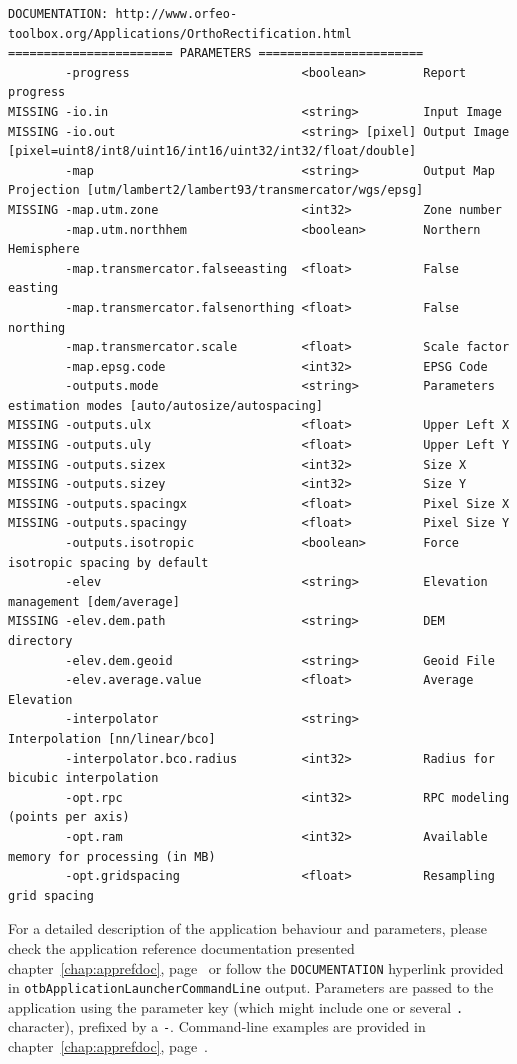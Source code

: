 \begin{scriptsize}
\begin{verbatim}
DOCUMENTATION: http://www.orfeo-toolbox.org/Applications/OrthoRectification.html
======================= PARAMETERS =======================
        -progress                        <boolean>        Report progress 
MISSING -io.in                           <string>         Input Image 
MISSING -io.out                          <string> [pixel] Output Image  [pixel=uint8/int8/uint16/int16/uint32/int32/float/double]
        -map                             <string>         Output Map Projection [utm/lambert2/lambert93/transmercator/wgs/epsg]
MISSING -map.utm.zone                    <int32>          Zone number 
        -map.utm.northhem                <boolean>        Northern Hemisphere 
        -map.transmercator.falseeasting  <float>          False easting 
        -map.transmercator.falsenorthing <float>          False northing 
        -map.transmercator.scale         <float>          Scale factor 
        -map.epsg.code                   <int32>          EPSG Code 
        -outputs.mode                    <string>         Parameters estimation modes [auto/autosize/autospacing]
MISSING -outputs.ulx                     <float>          Upper Left X 
MISSING -outputs.uly                     <float>          Upper Left Y 
MISSING -outputs.sizex                   <int32>          Size X 
MISSING -outputs.sizey                   <int32>          Size Y 
MISSING -outputs.spacingx                <float>          Pixel Size X 
MISSING -outputs.spacingy                <float>          Pixel Size Y 
        -outputs.isotropic               <boolean>        Force isotropic spacing by default 
        -elev                            <string>         Elevation management [dem/average]
MISSING -elev.dem.path                   <string>         DEM directory 
        -elev.dem.geoid                  <string>         Geoid File 
        -elev.average.value              <float>          Average Elevation 
        -interpolator                    <string>         Interpolation [nn/linear/bco]
        -interpolator.bco.radius         <int32>          Radius for bicubic interpolation 
        -opt.rpc                         <int32>          RPC modeling (points per axis) 
        -opt.ram                         <int32>          Available memory for processing (in MB) 
        -opt.gridspacing                 <float>          Resampling grid spacing 
\end{verbatim}
\end{scriptsize}


For a detailed description of the application behaviour and
parameters, please check the application reference documentation presented
chapter~\ref{chap:apprefdoc}, page~\pageref{chap:apprefdoc} or
follow the \verb?DOCUMENTATION? hyperlink provided in
\verb?otbApplicationLauncherCommandLine? output. Parameters are passed
to the application using the parameter key (which might include one or
several \verb?.? character), prefixed by a \verb?-?. Command-line
examples are provided in chapter~\ref{chap:apprefdoc},
page~\pageref{chap:apprefdoc}.


